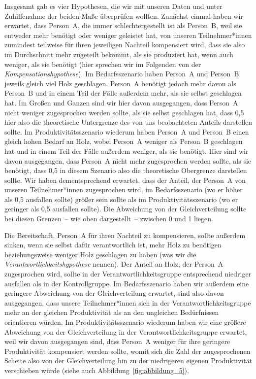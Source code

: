 \documentclass[justified,nobib,nohyper,symmetric,twoside]{tufte-book}
\begin{document}
Insgesamt gab es vier Hypothesen, die wir mit unseren Daten und unter Zuhilfenahme der beiden Maße überprüfen wollten.
Zunächst einmal haben wir erwartet, dass Person~A, die immer schlechtergestellt ist als Person~B, weil sie entweder mehr benötigt oder weniger geleistet hat, von unseren Teilnehmer*innen zumindest teilweise für ihren jeweiligen Nachteil kompensiert wird, dass sie also im Durchschnitt mehr zugeteilt bekommt, als sie produziert hat, wenn auch weniger, als sie benötigt (hier sprechen wir im Folgenden von der \textit{Kompensationshypothese}).
Im Bedarfsszenario haben Person~A und Person~B jeweils gleich viel Holz geschlagen.
Person~A benötigt jedoch mehr davon als Person~B und in einem Teil der Fälle außerdem mehr, als sie selbst geschlagen hat.
Im Großen und Ganzen sind wir hier davon ausgegangen, dass Person~A nicht weniger zugesprochen werden sollte, als sie selbst geschlagen hat, dass 0,5 hier also die theoretische Untergrenze des von uns beobachteten Anteils darstellen sollte.
Im Produktivitätsszenario wiederum haben Person~A und Person~B einen gleich hohen Bedarf an Holz, wobei Person~A weniger als Person~B geschlagen hat und in einem Teil der Fälle außerdem weniger, als sie benötigt.
Hier sind wir davon ausgegangen, dass Person~A nicht mehr zugesprochen werden sollte, als sie benötigt, dass 0,5 in diesem Szenario also die theoretische Obergrenze darstellen sollte.
Wir haben dementsprechend erwartet, dass der Anteil, der Person~A von unseren Teilnehmer*innen zugesprochen wird, im Bedarfsszenario (wo er höher als 0,5 ausfallen sollte) größer sein sollte als im Produktivitätsszenario (wo er geringer als 0,5 ausfallen sollte).
Die Abweichung von der Gleichverteilung sollte bei diesen Grenzen~-- wie oben dargestellt~-- zwischen 0 und 1 liegen.

Die Bereitschaft, Person~A für ihren Nachteil zu kompensieren, sollte außerdem sinken, wenn sie selbst dafür verantwortlich ist, mehr Holz zu benötigen beziehungsweise weniger Holz geschlagen zu haben (was wir die \textit{Verantwortlichkeitshypothese} nennen).
Der Anteil an Holz, der Person~A zugesprochen wird, sollte in der Verantwortlichkeitsgruppe entsprechend niedriger ausfallen als in der Kontrollgruppe.
Im Bedarfsszenario haben wir außerdem eine geringere Abweichung von der Gleichverteilung erwartet, sind also davon ausgegangen, dass unsere Teilnehmer*innen sich in der Verantwortlichkeitsgruppe mehr an der gleichen Produktivität als an den ungleichen Bedürfnissen orientieren würden.
Im Produktivitätsszenario wiederum haben wir eine größere Abweichung von der Gleichverteilung in der Verantwortlichkeitsgruppe erwartet, weil wir davon ausgegangen sind, dass Person~A weniger für ihre geringere Produktivität kompensiert werden sollte, womit sich die Zahl der zugesprochenen Scheite also von der Gleichverteilung hin zu der niedrigeren eigenen Produktivität verschieben würde (siehe auch Abbildung~\ref{fig:abbildung_5}).
\end{document}
